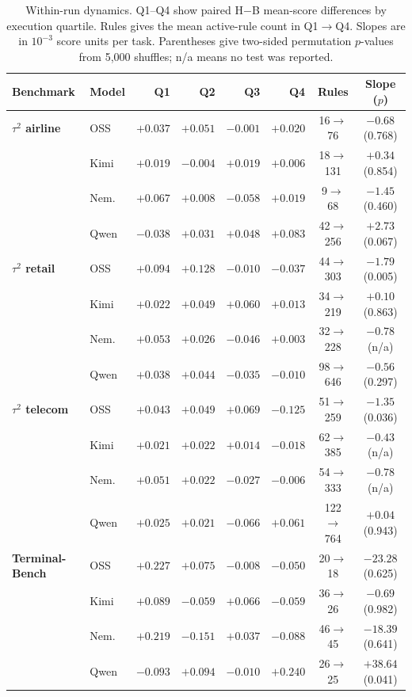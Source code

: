 \documentclass[11pt,letterpaper]{article}
\begin{document}
\begin{table}[H]
\centering\scriptsize
\setlength{\tabcolsep}{2.8pt}
\caption{Within-run dynamics. Q1--Q4 show
paired H$-$B mean-score differences by execution quartile. Rules gives the
mean active-rule count in Q1$\to$Q4. Slopes are in $10^{-3}$ score
units per task. Parentheses give two-sided permutation $p$-values from
5,000 shuffles; n/a means no test was reported.}
\label{tab:dynamics}
\begin{tabular*}{\linewidth}{@{\extracolsep{\fill}}llrrrrcc@{}}
\toprule
Benchmark & Model & Q1 & Q2 & Q3 & Q4 & Rules & Slope ($p$) \\
\midrule
\textbf{$\tau^2$ airline} & OSS & $+0.037$ & $+0.051$ & $-0.001$ & $+0.020$ & 16$\to$76 & $-0.68$ (0.768) \\
 & Kimi & $+0.019$ & $-0.004$ & $+0.019$ & $+0.006$ & 18$\to$131 & $+0.34$ (0.854) \\
 & Nem. & $+0.067$ & $+0.008$ & $-0.058$ & $+0.019$ & 9$\to$68 & $-1.45$ (0.460) \\
 & Qwen & $-0.038$ & $+0.031$ & $+0.048$ & $+0.083$ & 42$\to$256 & $+2.73$ (0.067) \\
\midrule
\textbf{$\tau^2$ retail} & OSS & $+0.094$ & $+0.128$ & $-0.010$ & $-0.037$ & 44$\to$303 & $-1.79$ (0.005) \\
 & Kimi & $+0.022$ & $+0.049$ & $+0.060$ & $+0.013$ & 34$\to$219 & $+0.10$ (0.863) \\
 & Nem. & $+0.053$ & $+0.026$ & $-0.046$ & $+0.003$ & 32$\to$228 & $-0.78$ (n/a) \\
 & Qwen & $+0.038$ & $+0.044$ & $-0.035$ & $-0.010$ & 98$\to$646 & $-0.56$ (0.297) \\
\midrule
\textbf{$\tau^2$ telecom} & OSS & $+0.043$ & $+0.049$ & $+0.069$ & $-0.125$ & 51$\to$259 & $-1.35$ (0.036) \\
 & Kimi & $+0.021$ & $+0.022$ & $+0.014$ & $-0.018$ & 62$\to$385 & $-0.43$ (n/a) \\
 & Nem. & $+0.051$ & $+0.022$ & $-0.027$ & $-0.006$ & 54$\to$333 & $-0.78$ (n/a) \\
 & Qwen & $+0.025$ & $+0.021$ & $-0.066$ & $+0.061$ & 122$\to$764 & $+0.04$ (0.943) \\
\midrule
\textbf{Terminal-Bench} & OSS & $+0.227$ & $+0.075$ & $-0.008$ & $-0.050$ & 20$\to$18 & $-23.28$ (0.625) \\
 & Kimi & $+0.089$ & $-0.059$ & $+0.066$ & $-0.059$ & 36$\to$26 & $-0.69$ (0.982) \\
 & Nem. & $+0.219$ & $-0.151$ & $+0.037$ & $-0.088$ & 46$\to$45 & $-18.39$ (0.641) \\
 & Qwen & $-0.093$ & $+0.094$ & $-0.010$ & $+0.240$ & 26$\to$25 & $+38.64$ (0.041) \\
\bottomrule
\end{tabular*}
\end{table}
\end{document}
